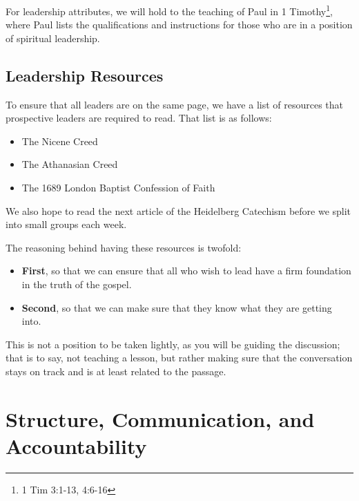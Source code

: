 \documentclass[12pt]{article}
\begin{document}
  For leadership attributes, we will hold to the teaching of Paul in
1 Timothy\footnote{1 Tim 3:1-13, 4:6-16}, where Paul lists the
qualifications and instructions for those who are in a position of spiritual
leadership.

\subsection{Leadership Resources}

To ensure that all leaders are on the same page, we have a list of resources
that prospective leaders are required to read. That list is as follows:

\begin{itemize}


	\item The Nicene Creed

	\item The Athanasian Creed

	\item The 1689 London Baptist Confession of Faith

\end{itemize}

  We also hope to read the next article of the Heidelberg Catechism before we
split into small groups each week.

  The reasoning behind having these resources is twofold:

\begin{itemize}


	\item \textbf{First}, so that we can ensure that all who wish to lead
	have a firm foundation in the truth of the gospel.

	\item \textbf{Second}, so that we can make sure that they know what they
	are getting into.

\end{itemize}

  This is not a position to be taken lightly, as you will be guiding the
discussion; that is to say, not teaching a lesson, but rather making sure that
the conversation stays on track and is at least related to the passage.

\section{Structure, Communication, and Accountability}
\end{document}
